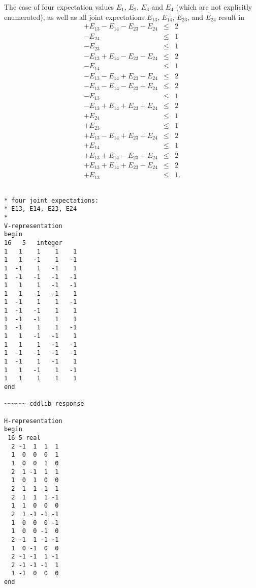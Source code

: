 \documentclass[%
  twocolumn,
 showpacs,
 showkeys,
 preprintnumbers,
 amsmath,amssymb,
 aps,
  pra,
  longbibliography,
 floatfix,
 ]{revtex4-1}
\begin{document}
The case of four expectation values
$E_1$, $E_2$, $E_3$  and $E_4$ (which are not explicitly enumerated),
as well as all joint expectations $E_{13}$, $E_{14}$, $E_{23}$, and $E_{24}$
result in
\begin{eqnarray}
   + E_{13} - E_{14} - E_{23} - E_{24}       &\le&      2    \\
                              - E_{24}       &\le&      1    \\
                     - E_{23}                &\le&      1    \\
   - E_{13} + E_{14} - E_{23} - E_{24}       &\le&      2    \\
            - E_{14}                         &\le&      1    \\
   - E_{13} - E_{14} + E_{23} - E_{24}       &\le&      2    \\
   - E_{13} - E_{14} - E_{23} + E_{24}       &\le&      2    \\
   - E_{13}                                  &\le&      1    \\
   - E_{13} + E_{14} + E_{23} + E_{24}       &\le&      2    \\
                              + E_{24}       &\le&      1    \\
                     + E_{23}                &\le&      1    \\
   + E_{13} - E_{14} + E_{23} + E_{24}       &\le&      2    \\
            + E_{14}                         &\le&      1    \\
   + E_{13} + E_{14} - E_{23} + E_{24}       &\le&      2    \\
   + E_{13} + E_{14} + E_{23} - E_{24}       &\le&      2    \\
   + E_{13}                                  &\le&      1
.
\label{2017-b-2-2-e-i}
\end{eqnarray}

{ \begin{lstlisting}[backgroundcolor=\color{yellow!10},framerule=0pt,breaklines=true, frame=tb]

* four joint expectations:
* E13, E14, E23, E24
*
V-representation
begin
16   5   integer
1   1    1    1    1
1   1   -1    1   -1
1  -1    1   -1    1
1  -1   -1   -1   -1
1   1    1   -1   -1
1   1   -1   -1    1
1  -1    1    1   -1
1  -1   -1    1    1
1  -1   -1    1    1
1  -1    1    1   -1
1   1   -1   -1    1
1   1    1   -1   -1
1  -1   -1   -1   -1
1  -1    1   -1    1
1   1   -1    1   -1
1   1    1    1    1
end

~~~~~~ cddlib response

H-representation
begin
 16 5 real
  2 -1  1  1  1
  1  0  0  0  1
  1  0  0  1  0
  2  1 -1  1  1
  1  0  1  0  0
  2  1  1 -1  1
  2  1  1  1 -1
  1  1  0  0  0
  2  1 -1 -1 -1
  1  0  0  0 -1
  1  0  0 -1  0
  2 -1  1 -1 -1
  1  0 -1  0  0
  2 -1 -1  1 -1
  2 -1 -1 -1  1
  1 -1  0  0  0
end

\end{lstlisting}  }
\end{document}
